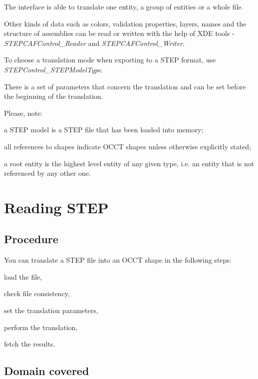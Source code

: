 The interface is able to translate one entity, a group of entities or a whole file.

Other kinds of data such as colors, validation properties, layers, names and the structure of assemblies can be read or written with the help of X\+DE tools -\/ {\itshape  S\+T\+E\+P\+C\+A\+F\+Control\+\_\+\+Reader} and {\itshape  S\+T\+E\+P\+C\+A\+F\+Control\+\_\+\+Writer}.

To choose a translation mode when exporting to a S\+T\+EP format, use {\itshape  S\+T\+E\+P\+Control\+\_\+\+S\+T\+E\+P\+Model\+Type}.

There is a set of parameters that concern the translation and can be set before the beginning of the translation.

Please, note\+:
\begin{DoxyItemize}
\item a S\+T\+EP model is a S\+T\+EP file that has been loaded into memory;
\item all references to shapes indicate O\+C\+CT shapes unless otherwise explicitly stated;
\item a root entity is the highest level entity of any given type, i.\+e. an entity that is not referenced by any other one.
\end{DoxyItemize}\hypertarget{occt_user_guides__step_occt_step_2}{}\section{Reading S\+T\+EP}\label{occt_user_guides__step_occt_step_2}
\hypertarget{occt_user_guides__step_occt_step_2_1}{}\subsection{Procedure}\label{occt_user_guides__step_occt_step_2_1}
You can translate a S\+T\+EP file into an O\+C\+CT shape in the following steps\+:
\begin{DoxyEnumerate}
\item load the file,
\item check file consistency,
\item set the translation parameters,
\item perform the translation,
\item fetch the results. 
\end{DoxyEnumerate}\hypertarget{occt_user_guides__step_occt_step_2_2}{}\subsection{Domain covered}\label{occt_user_guides__step_occt_step_2_2}
